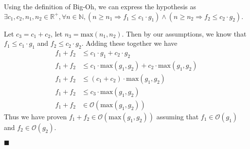 \documentclass{article}
\newcommand\qedsymbol{\hfill$\blacksquare$}
\begin{document}
\begin{enumerate}[label = (\alph*)]
        Using the definition of Big-Oh, we can express the hypothesis
        as $\exists c_1, c_2 , n_1 , n_2\in \mathbb{R}^+, \forall n \in 
        \mathbb{N}, (n \geq n_1 \Rightarrow f_1  \leq c_1 \cdot 
        g_1) \land (n \geq n_2 \Rightarrow f_2 \leq c_2 \cdot 
        g_2)$.
            
        Let $c_3 = c_1 + c_2$, let $n_3 = \text{max} (n_1, n_2)$. Then 
        by our assumptions, we know that $f_1 \leq c_1 \cdot g_1$ and 
        $f_2 \leq c_2 \cdot g_2$. Adding these together we have 
        \begin{align*}
            f_1 + f_2 &\leq c_1 \cdot g_1 + c_2 \cdot g_2 \\
             f_1 + f_2&\leq c_1 \cdot \text{max} (g_1, g_2) + c_2 \cdot
                \text{max} (g_1, g_2) \tag*{(max($g_1, g_2$) $\geq g_1$, same for $g_2$)}\\
                 f_1 + f_2     &\leq (c_1 + c_2) \cdot \text{max}  (g_1, g_2) \\
               f_1 + f_2       &\leq c_3\cdot \text{max} (g_1, g_2) \\
               f_1 + f_2 &\in \mathcal{O} (\text{max} (g_1, g_2)) \tag*{($n \geq n_3$)}
        \end{align*}
        Thus we have proven $f_1 + f_2 \in \mathcal{O} (\text{max} (g_1, g_2))$ 
    assuming that $f_1 \in \mathcal{O}(g_1)$ and $f_2 \in \mathcal{O} (g_2)$. 

        \qedsymbol

\end{enumerate}
\end{document}
